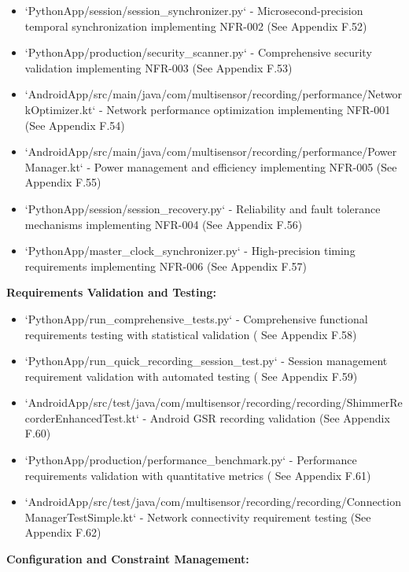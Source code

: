 \documentclass[12pt,a4paper]{report}
\begin{document}
\begin{itemize}
\item `PythonApp/session/session_synchronizer.py` - Microsecond-precision temporal synchronization implementing
  NFR-002 (See Appendix F.52)
\item `PythonApp/production/security_scanner.py` - Comprehensive security validation implementing NFR-003 (See Appendix
  F.53)
\item `AndroidApp/src/main/java/com/multisensor/recording/performance/NetworkOptimizer.kt` - Network performance
  optimization implementing NFR-001 (See Appendix F.54)
\item `AndroidApp/src/main/java/com/multisensor/recording/performance/PowerManager.kt` - Power management and efficiency
  implementing NFR-005 (See Appendix F.55)
\item `PythonApp/session/session_recovery.py` - Reliability and fault tolerance mechanisms implementing NFR-004 (See
  Appendix F.56)
\item `PythonApp/master_clock_synchronizer.py` - High-precision timing requirements implementing NFR-006 (See Appendix
  F.57)

\end{itemize}
\textbf{Requirements Validation and Testing:}

\begin{itemize}
\item `PythonApp/run_comprehensive_tests.py` - Comprehensive functional requirements testing with statistical validation (
  See Appendix F.58)
\item `PythonApp/run_quick_recording_session_test.py` - Session management requirement validation with automated testing (
  See Appendix F.59)
\item `AndroidApp/src/test/java/com/multisensor/recording/recording/ShimmerRecorderEnhancedTest.kt` - Android GSR recording
  validation (See Appendix F.60)
\item `PythonApp/production/performance_benchmark.py` - Performance requirements validation with quantitative metrics (
  See Appendix F.61)
\item `AndroidApp/src/test/java/com/multisensor/recording/recording/ConnectionManagerTestSimple.kt` - Network connectivity
  requirement testing (See Appendix F.62)

\end{itemize}
\textbf{Configuration and Constraint Management:}
\end{document}
